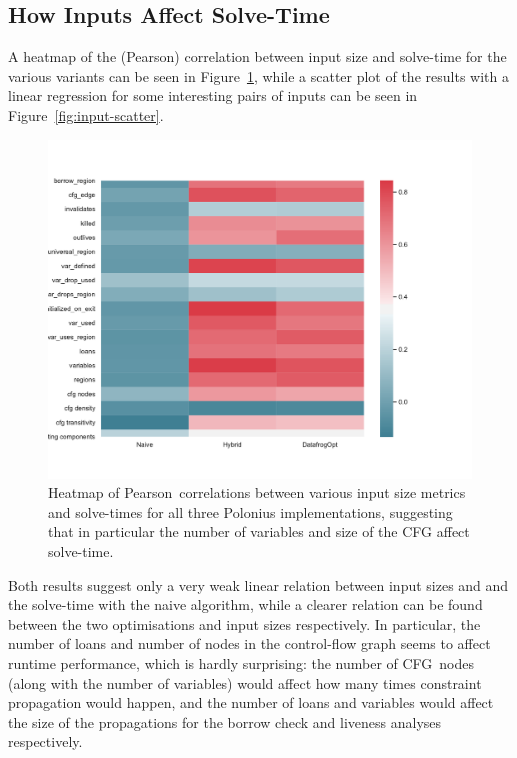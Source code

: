\documentclass[11pt,a4paper,twoside,openany]{report}
\begin{document}
\subsection{How Inputs Affect Solve-Time}\label{sec:inputs:correlation}

A heatmap of the (Pearson) correlation between input size and solve-time for the
various variants can be seen in Figure~\ref{fig:corr-heatmap}, while a scatter
plot of the results with a linear regression for some interesting pairs of
inputs can be seen in Figure~\ref{fig:input-scatter}.

\begin{figure}
  \includegraphics[width=0.9\linewidth]{Graphs/corr_heatmap.pdf}
  \caption{Heatmap of Pearson~correlations between various input size metrics
    and solve-times for all three Polonius implementations, suggesting that in
    particular the number of variables and size of the CFG affect solve-time.}
  \label{fig:corr-heatmap}
\end{figure}

Both results suggest only a very weak linear relation between input sizes and
and the solve-time with the naive algorithm, while a clearer relation can be
found between the two optimisations and input sizes respectively. In particular,
the number of loans and number of nodes in the control-flow graph seems to
affect runtime performance, which is hardly surprising: the number of CFG~nodes
(along with the number of variables) would affect how many times constraint
propagation would happen, and the number of loans and variables would affect the
size of the propagations for the borrow check and liveness analyses
respectively.
\end{document}
